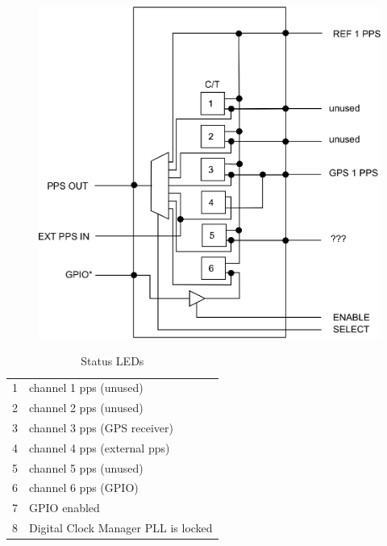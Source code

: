 
\begin{figure}
\centerline{\includegraphics{figures/ottpcounter.eps}}
\end{figure}

\begin{table}
\begin{center}
\begin{tabular}{ll}
1 & channel 1 pps (unused)\\
2 & channel 2 pps (unused) \\
3 & channel 3 pps (GPS receiver)\\
4 & channel 4 pps (external pps)\\
5 & channel 5 pps (unused)\\
6 & channel 6 pps (GPIO)\\
7 & GPIO enabled\\
8 & Digital Clock Manager PLL is locked\\
\end{tabular}
\end{center}
\caption{Status LEDs}
\end{table}